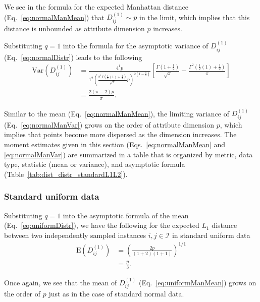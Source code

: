 \documentclass[aos]{imsart}
\begin{document}
We see in the formula for the expected Manhattan distance (Eq.~\ref{eq:normalManMean}) that $D^{(1)}_{ij} \sim p$ in the limit, which implies that this distance is unbounded as attribute dimension $p$ increases.

Substituting $q=1$ into the formula for the asymptotic variance of $D^{(1)}_{ij}$ (Eq.~\ref{eq:normalDistr}) leads to the following
%
\begin{equation}\label{eq:normalManVar}
\begin{aligned}
\text{Var}\left(D^{(1)}_{ij}\right) &= \frac{4^1p}{1^2\left(\frac{2^1\Gamma\left(\frac{1}{2}(1) + \frac{1}{2}\right)}{\sqrt{\pi}}p\right)^{2\left(1 - \frac{1}{1}\right)}}\left[\frac{\Gamma\left(1 + \frac{1}{2}\right)}{\sqrt{\pi}} - \frac{\Gamma^2\left(\frac{1}{2}(1) + \frac{1}{2}\right)}{\pi}\right] \\
&= \frac{2(\pi - 2)p}{\pi}.
\end{aligned}
\end{equation}

Similar to the mean (Eq.~\ref{eq:normalManMean}), the limiting variance of $D^{(1)}_{ij}$ (Eq.~\ref{eq:normalManVar}) grows on the order of attribute dimension $p$, which implies that points become more dispersed as the dimension increases. The moment estimates given in this section (Eqs.~\ref{eq:normalManMean} and \ref{eq:normalManVar}) are summarized in a table that is organized by metric, data type, statistic (mean or variance), and asymptotic formula (Table~\ref{tab:dist_distr_standardL1L2}).

\subsubsection{Standard uniform data}

Substituting $q=1$ into the asymptotic formula of the mean (Eq.~\ref{eq:uniformDistr}), we have the following for the expected $L_1$ distance between two independently sampled instances $i,j \in \mathcal{I}$ in standard uniform data
%
\begin{equation}\label{eq:uniformManMean}
\begin{aligned}
\text{E}\left(D^{(1)}_{ij}\right) &= \left(\frac{2p}{(1+2)(1+1)}\right)^{1/1} \\
&= \frac{p}{3}.
\end{aligned}
\end{equation}

Once again, we see that the mean of $D^{(1)}_{ij}$ (Eq.~\ref{eq:uniformManMean}) grows on the order of $p$ just as in the case of standard normal data.
\end{document}
